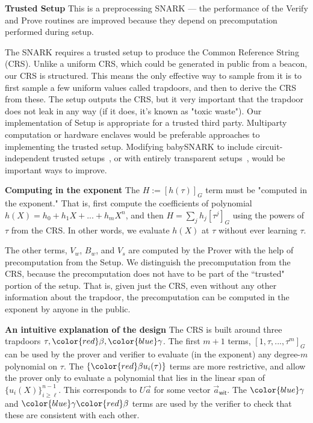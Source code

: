 \documentclass{article}
\theoremstyle{definition}
\theoremstyle{remark}
\begin{document}
\textbf{Trusted Setup}
This is a preprocessing SNARK --- the performance of the Verify and Prove routines are improved because they depend on precomputation performed during setup.

The SNARK requires a trusted setup to produce the Common Reference String (CRS). Unlike a uniform CRS, which could be generated in public from a beacon, our CRS is structured. This means the only effective way to sample from it is to first sample a few uniform values called trapdoors, and then to derive the CRS from these. The setup outputs the CRS, but it very important that the trapdoor does not leak in any way (if it does, it's known as "toxic waste").
Our implementation of Setup is appropriate for a trusted third party. 
Multiparty computation or hardware enclaves would be preferable approaches to implementing the trusted setup.
Modifying babySNARK to include circuit-independent trusted setups~\cite{groth2018updatable}, or with entirely transparent setups~\cite{stark,marlin}, would be important ways to improve.

\textbf{Computing in the exponent} 
The $H := \left[ h(\tau) \right]_G$ term must be "computed in the exponent." That is, first compute the coefficients of polynomial $h(X) = h_0 + h_1 X + ... + h_m X^n$, and then $H = \sum_{j} h_j \left[ \tau^j \right]_G$ using the powers of $\tau$ from the CRS. In other words, we evaluate $h(X)$ at $\tau$ without ever learning $\tau$.

The other terms, $V_w$, $B_w$, and $V_s$ are computed by the Prover with the help of precomputation from the Setup. We distinguish the precomputation from the CRS, because the precomputation does not have to be part of the ``trusted" portion of the setup. That is, given just the CRS, even without any other information about the trapdoor, the precomputation can be computed in the exponent by anyone in the public.

\textbf{An intuitive explanation of the design}
The CRS is built around three trapdoors $\tau,{\color{red}\beta},{\color{blue}\gamma}$. 
%
%
The first $m+1$ terms, $\left[ 1, \tau, ..., \tau^m \right]_G$ can be used by the prover and verifier to evaluate (in the exponent) any degree-$m$ polynomial on $\tau$.
The $\{{\color{red}\beta}u_i(\tau)\}$ terms are more restrictive, and allow the prover only to evaluate a polynomial that lies in the linear span of $\{u_i(X)\}_{i\ge\ell}^{n-1}$. This corresponds to $U\vec{a}$ for some vector $\vec{a}_\textsf{wit}$. 
The ${\color{blue}\gamma}$ and ${\color{blue}\gamma}{\color{red}\beta}$ terms are used by the verifier to check that these are consistent with each other. 
\end{document}
